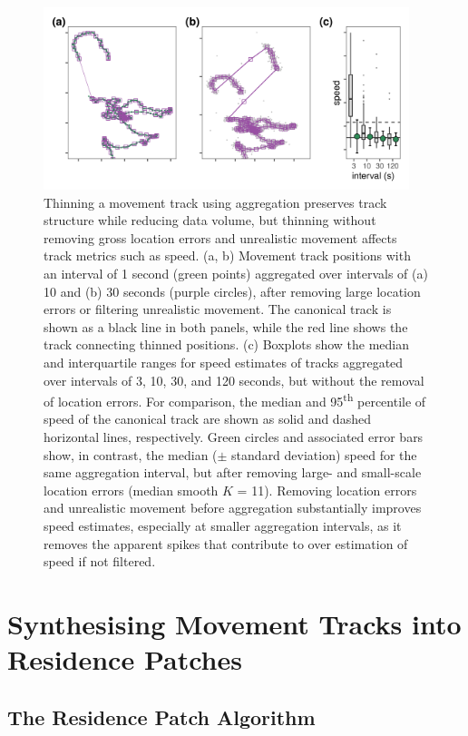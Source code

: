 \documentclass[10pt,paper=a4,headings=standardclasses
]{scrartcl}
\begin{document}
\begin{figure}[h!]
    \centering
    \includegraphics[width=0.95\textwidth]{figures/fig_04_thinning.png}
    \caption{Thinning a movement track using aggregation preserves track structure while reducing data volume, but thinning without removing gross location errors and unrealistic movement affects track metrics such as speed.
    (a, b) Movement track positions with an interval of 1 second (green points) aggregated over intervals of (a) 10 and (b) 30 seconds (purple circles), after removing large location errors or filtering unrealistic movement.
    The canonical track is shown as a black line in both panels, while the red line shows the track connecting thinned positions.
    (c) Boxplots show the median and interquartile ranges for speed estimates of tracks aggregated over intervals of 3, 10, 30, and 120 seconds, but without the removal of location errors.
    For comparison, the median and 95\textsuperscript{th} percentile of speed of the canonical track are shown as solid and dashed horizontal lines, respectively.
    Green circles and associated error bars show, in contrast, the median ($\pm$ standard deviation) speed for the same aggregation interval, but after removing large- and small-scale location errors (median smooth $K$ = 11).
    Removing location errors and unrealistic movement before aggregation substantially improves speed estimates, especially at smaller aggregation intervals, as it removes the apparent spikes that contribute to over estimation of speed if not filtered.}
    \label{fig:figure_thinning}
\end{figure}

\section{Synthesising Movement Tracks into Residence Patches}

\subsection{The Residence Patch Algorithm}
\end{document}
